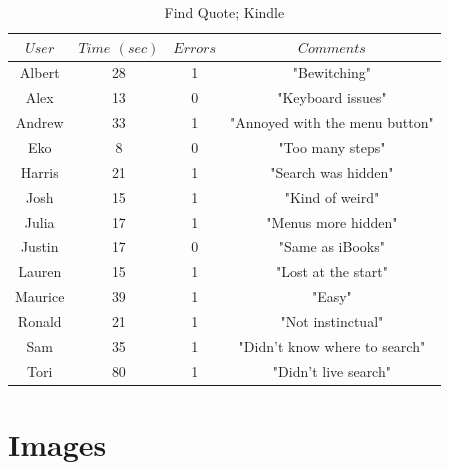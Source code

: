 \documentclass[11pt, oneside]{article}
\begin{document}
\begin{table}[!hbt]
\begin{center}
\caption{Find Quote; Kindle}
\label{tab:task3learnKindle}
\begin{tabular}{|c|c|c|c|}
\hline
$User$ & $Time$ $(sec)$ & $Errors$ & $Comments$\\
\hline
Albert & 28 & 1 & "Bewitching"\\
\hline
Alex & 13 & 0 & "Keyboard issues"\\
\hline
Andrew & 33 & 1 & "Annoyed with the menu button"\\
\hline
Eko & 8 & 0 & "Too many steps"\\
\hline
Harris & 21 & 1 & "Search was hidden"\\
\hline
Josh & 15 & 1 & "Kind of weird"\\
\hline
Julia & 17 & 1 & "Menus more hidden"\\
\hline
Justin & 17 & 0 & "Same as iBooks"\\
\hline
Lauren & 15 & 1 & "Lost at the start"\\
\hline
Maurice & 39 & 1 & "Easy"\\
\hline
Ronald & 21 & 1 & "Not instinctual"\\
\hline
Sam & 35 & 1 & "Didn't know where to search"\\
\hline
Tori & 80 & 1 & "Didn't live search"\\
\hline
\end{tabular}
\end{center}
\end{table}


\section{Images}
\end{document}
